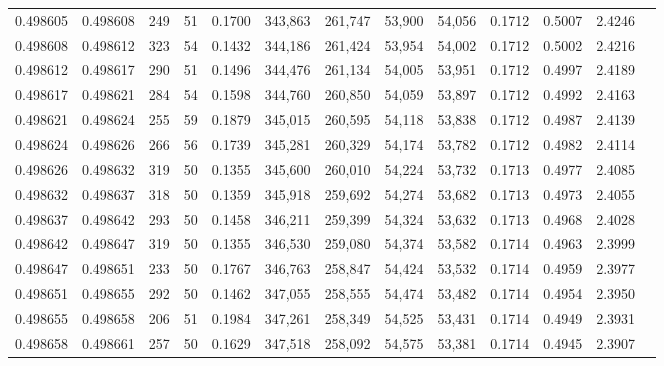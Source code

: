 \begin{tabular}{rrrrrrrrrrrrr}
0.498605 & 0.498608 & 249 &  51 &                                     0.1700 & 343,863 & 261,747 &  53,900 &  54,056 & 0.1712 & 0.5007 & 2.4246 \\
0.498608 & 0.498612 & 323 &  54 &                                     0.1432 & 344,186 & 261,424 &  53,954 &  54,002 & 0.1712 & 0.5002 & 2.4216 \\
0.498612 & 0.498617 & 290 &  51 &                                     0.1496 & 344,476 & 261,134 &  54,005 &  53,951 & 0.1712 & 0.4997 & 2.4189 \\
0.498617 & 0.498621 & 284 &  54 &                                     0.1598 & 344,760 & 260,850 &  54,059 &  53,897 & 0.1712 & 0.4992 & 2.4163 \\
0.498621 & 0.498624 & 255 &  59 &                                     0.1879 & 345,015 & 260,595 &  54,118 &  53,838 & 0.1712 & 0.4987 & 2.4139 \\
0.498624 & 0.498626 & 266 &  56 &                                     0.1739 & 345,281 & 260,329 &  54,174 &  53,782 & 0.1712 & 0.4982 & 2.4114 \\
0.498626 & 0.498632 & 319 &  50 &                                     0.1355 & 345,600 & 260,010 &  54,224 &  53,732 & 0.1713 & 0.4977 & 2.4085 \\
0.498632 & 0.498637 & 318 &  50 &                                     0.1359 & 345,918 & 259,692 &  54,274 &  53,682 & 0.1713 & 0.4973 & 2.4055 \\
0.498637 & 0.498642 & 293 &  50 &                                     0.1458 & 346,211 & 259,399 &  54,324 &  53,632 & 0.1713 & 0.4968 & 2.4028 \\
0.498642 & 0.498647 & 319 &  50 &                                     0.1355 & 346,530 & 259,080 &  54,374 &  53,582 & 0.1714 & 0.4963 & 2.3999 \\
0.498647 & 0.498651 & 233 &  50 &                                     0.1767 & 346,763 & 258,847 &  54,424 &  53,532 & 0.1714 & 0.4959 & 2.3977 \\
0.498651 & 0.498655 & 292 &  50 &                                     0.1462 & 347,055 & 258,555 &  54,474 &  53,482 & 0.1714 & 0.4954 & 2.3950 \\
0.498655 & 0.498658 & 206 &  51 &                                     0.1984 & 347,261 & 258,349 &  54,525 &  53,431 & 0.1714 & 0.4949 & 2.3931 \\
0.498658 & 0.498661 & 257 &  50 &                                     0.1629 & 347,518 & 258,092 &  54,575 &  53,381 & 0.1714 & 0.4945 & 2.3907 \\

\end{tabular}
